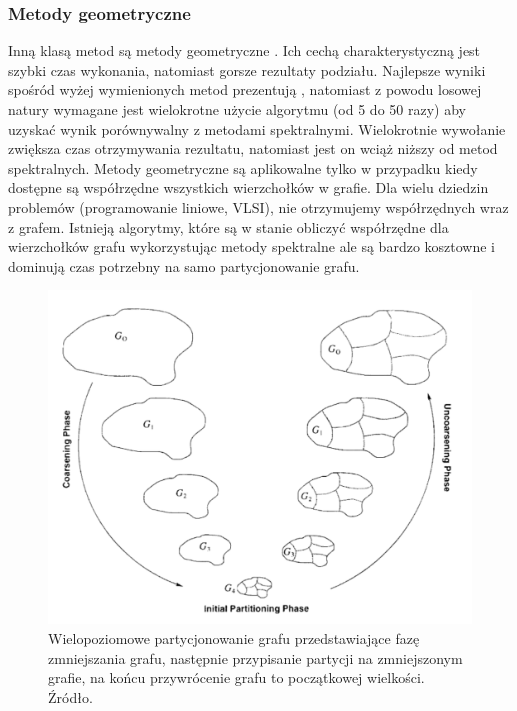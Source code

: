 \subsubsection{Metody geometryczne}
Inną klasą metod są metody geometryczne \cite{Miller1994ACP, Raghavan93lineand, 185417, MiTeThVa93, NourOmid1987SolvingFE}.
Ich cechą charakterystyczną jest szybki czas wykonania, natomiast gorsze rezultaty podziału.
Najlepsze wyniki spośród wyżej wymienionych metod prezentują \cite{185417, MiTeThVa93}, natomiast z powodu
losowej natury wymagane jest wielokrotne użycie algorytmu (od 5 do 50 razy) aby uzyskać wynik porównywalny
z metodami spektralnymi. Wielokrotnie wywołanie zwiększa czas otrzymywania rezultatu, natomiast jest
on wciąż niższy od metod spektralnych. Metody geometryczne są aplikowalne tylko w przypadku kiedy dostępne
są współrzędne wszystkich wierzchołków w grafie. Dla wielu dziedzin problemów (programowanie liniowe, VLSI),
nie otrzymujemy współrzędnych wraz z grafem. Istnieją algorytmy, które są w stanie obliczyć współrzędne dla
wierzchołków grafu \cite{Chan95geometricspectral} wykorzystując metody spektralne ale są bardzo kosztowne i dominują czas potrzebny
na samo partycjonowanie grafu.
\newline\newline

\begin{figure}[h]
    \centering
    \includegraphics[width=\linewidth]{images/coarsening}
    \caption{Wielopoziomowe partycjonowanie grafu przedstawiające fazę zmniejszania grafu, następnie przypisanie
    partycji na zmniejszonym grafie, na końcu przywrócenie grafu to początkowej wielkości.
    Źródło\cite{KARYPIS199896}.}
    \label{im:multilevel_partitioning}
\end{figure}

